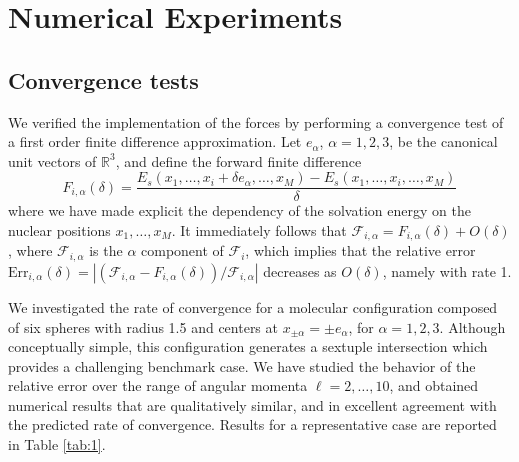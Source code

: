 \section{Numerical Experiments}\label{sec:experiments}
\subsection{Convergence tests}
We verified the implementation of the forces by performing a convergence test of a first order finite difference approximation. Let $e_\alpha$, $\alpha=1,2,3$, be the canonical unit vectors of $\mathbb R^3$, and define the forward finite difference
\[
	F_{i,\alpha}(\delta)
	= 
	\frac{E_s(x_1,\ldots,x_i + \delta e_\alpha,\ldots,x_M) - E_s(x_1,\ldots,x_i,\ldots,x_M)}{\delta}
\]
where we have made explicit the dependency of the solvation energy on the nuclear positions $x_1 , \ldots , x_M$. It immediately follows that $\mathcal{F}_{i,\alpha} = F_{i,\alpha}(\delta) + O(\delta)$, where $\mathcal{F}_{i,\alpha}$ is the $\alpha$ component of $\mathcal{F}_i$, which implies that the relative error $\text{Err}_{i,\alpha}(\delta) = |(\mathcal{F}_{i,\alpha} - F_{i,\alpha}(\delta))/\mathcal{F}_{i,\alpha}|$ decreases as $O(\delta)$, namely with rate 1.

We investigated the rate of convergence for a molecular configuration composed of six spheres with radius 1.5 and centers at $x_{\pm \alpha} = \pm e_\alpha$, for $\alpha = 1, 2,3$. Although conceptually simple, this configuration generates a sextuple intersection which provides a challenging benchmark case. We have studied the behavior of the relative error over the range of angular momenta $\ell = 2, \ldots , 10$, and obtained numerical results that are qualitatively similar, and in excellent agreement with the predicted rate of convergence. Results for a representative case are reported in Table \ref{tab:1}.


